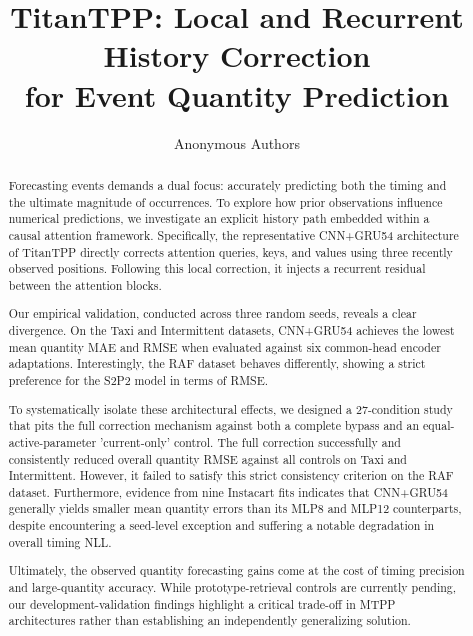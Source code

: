 \documentclass[runningheads]{llncs}
\begin{document}
\title{TitanTPP: Local and Recurrent History Correction\texorpdfstring{\\}{ }for Event Quantity Prediction}
\author{Anonymous Authors}
\maketitle

\begin{abstract}
Forecasting events demands a dual focus: accurately predicting both the timing and the ultimate magnitude of occurrences.
To explore how prior observations influence numerical predictions, we investigate an explicit history path embedded within a causal attention framework.
Specifically, the representative CNN+GRU54 architecture of TitanTPP directly corrects attention queries, keys, and values using three recently observed positions.
Following this local correction, it injects a recurrent residual between the attention blocks.

Our empirical validation, conducted across three random seeds, reveals a clear divergence.
On the Taxi and Intermittent datasets, CNN+GRU54 achieves the lowest mean quantity MAE and RMSE when evaluated against six common-head encoder adaptations.
Interestingly, the RAF dataset behaves differently, showing a strict preference for the S2P2 model in terms of RMSE.

To systematically isolate these architectural effects, we designed a 27-condition study that pits the full correction mechanism against both a complete bypass and an equal-active-parameter 'current-only' control.
The full correction successfully and consistently reduced overall quantity RMSE against all controls on Taxi and Intermittent.
However, it failed to satisfy this strict consistency criterion on the RAF dataset.
Furthermore, evidence from nine Instacart fits indicates that CNN+GRU54 generally yields smaller mean quantity errors than its MLP8 and MLP12 counterparts, despite encountering a seed-level exception and suffering a notable degradation in overall timing NLL.

Ultimately, the observed quantity forecasting gains come at the cost of timing precision and large-quantity accuracy.
While prototype-retrieval controls are currently pending, our development-validation findings highlight a critical trade-off in MTPP architectures rather than establishing an independently generalizing solution.
\end{abstract}
\end{document}
